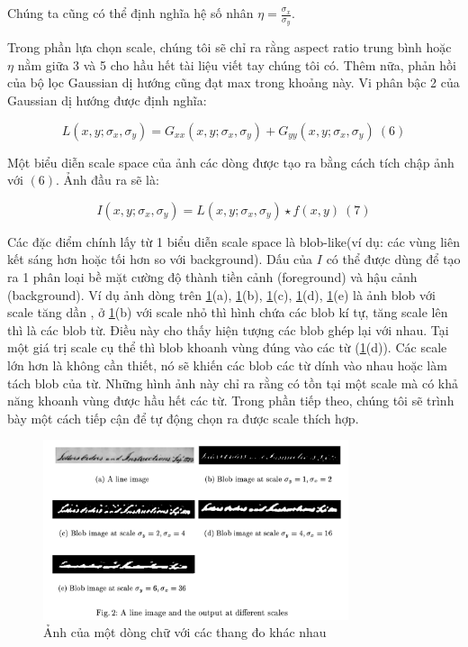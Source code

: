 \documentclass[a4paper]{article}
\begin{document}
Chúng ta cũng có thể định nghĩa hệ số nhân $\eta = \frac {\sigma_x}{\sigma_y}$.

Trong phần lựa chọn scale, chúng tôi sẽ chỉ ra rằng aspect ratio trung bình hoặc $\eta$  nằm giữa 3 và 5 cho hầu hết tài liệu viết tay chúng tôi có. Thêm nữa, phản hồi của bộ lọc Gaussian dị hướng cũng đạt max trong khoảng này. Vi phân bậc 2 của Gaussian dị hướng được định nghĩa:

\begin{equation}
    L(x, y; \sigma_x,\sigma_y) = G_{xx}(x, y; \sigma_x, \sigma_y) + G_{yy}(x, y; \sigma_x, \sigma_y) ~(6)
\end{equation}

Một biểu diễn scale space của ảnh các dòng được tạo ra bằng cách tích chập ảnh với $(6)$. Ảnh đầu ra sẽ là:

\begin{equation}
    I(x, y; \sigma_x, \sigma_y) = L(x, y; \sigma_x, \sigma_y) \star f(x, y)~(7)
\end{equation}

Các đặc điểm chính lấy từ 1 biểu diễn scale space là blob-like(ví dụ: các vùng liên kết sáng hơn hoặc tối hơn so với background). Dấu của $I$ có thể được dùng để tạo ra 1 phân loại bề mặt cường độ thành tiền cảnh (foreground) và hậu cảnh (background). Ví dụ ảnh dòng trên \ref{fig:fig2}(a), \ref{fig:fig2}(b), \ref{fig:fig2}(c), \ref{fig:fig2}(d), \ref{fig:fig2}(e) là ảnh blob với scale tăng dần , ở \ref{fig:fig2}(b) với scale nhỏ thì hình chứa các blob kí tự, tăng scale lên thì là các blob từ. Điều này cho thấy hiện tượng các blob ghép lại với nhau. Tại một giá trị scale cụ thể thì blob khoanh vùng đúng vào các từ (\ref{fig:fig2}(d)). Các scale lớn hơn là không cần thiết, nó sẽ khiến các blob các từ dính vào nhau hoặc làm tách blob của từ. Những hình ảnh này chỉ ra rằng có tồn tại một scale mà có khả năng khoanh vùng được hầu hết các từ. Trong phần tiếp theo, chúng tôi sẽ trình bày một cách tiếp cận để tự động chọn ra được scale thích hợp.

\begin{figure}
    \centering
    \includegraphics[width=0.8\textwidth]{fig2.png}
    \caption{Ảnh của một dòng chữ với các thang đo khác nhau}
    \label{fig:fig2}    
\end{figure}
\end{document}
